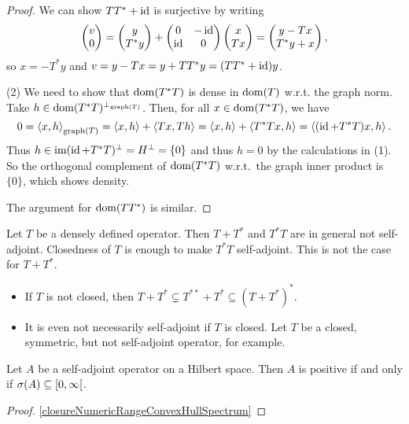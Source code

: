 \begin{proof}
We can show $TT^* + \operatorname{id}$ is surjective by writing
\[ \begin{pmatrix}
v \\ 0
\end{pmatrix} = \begin{pmatrix}
y \\ T^*y
\end{pmatrix} + \begin{pmatrix}
0 & -\operatorname{id} \\ \operatorname{id} & 0
\end{pmatrix}\begin{pmatrix}
x \\ Tx
\end{pmatrix} = \begin{pmatrix}
y - Tx \\ T^*y + x
\end{pmatrix}, \]
so $x = -T^*y$ and $v = y - Tx = y+TT^*y = (TT^* + \operatorname{id})y$.

(2) We need to show that $\operatorname{dom}(T^*T)$ is dense in $\operatorname{dom}(T)$ w.r.t. the graph norm. Take $h\in \operatorname{dom}(T^*T)^{\perp_{\operatorname{graph}(T)}}$. Then, for all $x\in \operatorname{dom}(T^*T)$, we have
\[ 0 = \left\langle x,h \right\rangle_{\operatorname{graph}(T)} = \left\langle x,h \right\rangle + \left\langle Tx,Th \right\rangle = \left\langle x,h \right\rangle + \left\langle T^*Tx,h \right\rangle = \left\langle (\operatorname{id} + T^*T)x,h \right\rangle. \]
Thus $h\in \operatorname{im}(\operatorname{id}+T^*T)^\perp = H^\perp = \{0\}$ and thus $h=0$ by the calculations in (1). So the orthogonal complement of $\operatorname{dom}(T^*T)$ w.r.t.\ the graph inner product is $\{0\}$, which shows density.

The argument for $\operatorname{dom}(TT^*)$ is similar.
\end{proof}

\begin{example}
Let $T$ be a densely defined operator. Then $T+T^*$ and $T^*T$ are in general not self-adjoint. Closedness of $T$ is enough to make $T^*T$ self-adjoint. This is not the case for $T+T^*$.
\begin{itemize}
\item If $T$ is not closed, then $T+T^* \subsetneq T^{**} + T^* \subseteq (T+T^*)^*$.
\item It is even not necessarily self-adjoint if $T$ is closed. Let $T$ be a closed, symmetric, but not self-adjoint operator, for example.
\end{itemize}
\end{example}

\begin{proposition}
Let $A$ be a self-adjoint operator on a Hilbert space. Then $A$ is positive \textup{if and only if} $\spec(A)\subseteq \interval[co]{0,\infty}$.
\end{proposition}
\begin{proof}
\ref{closureNumericRangeConvexHullSpectrum}
\end{proof}

